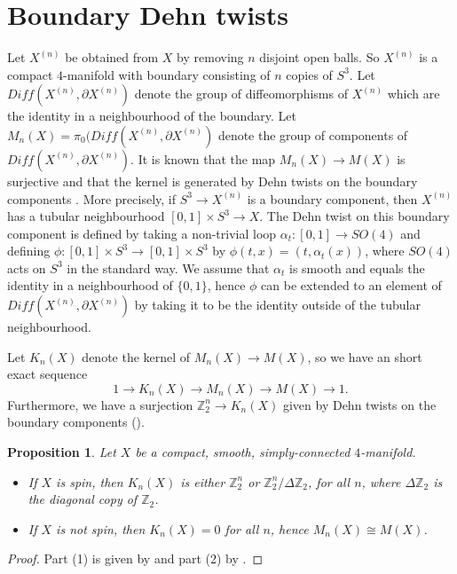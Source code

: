 \documentclass{amsart}
\newtheorem{proposition}[theorem]{Proposition}
\theoremstyle{definition}
\theoremstyle{remark}
\numberwithin{equation}{section}
\begin{document}
\section{Boundary Dehn twists}\label{sec:bdt}

Let $X^{(n)}$ be obtained from $X$ by removing $n$ disjoint open balls. So $X^{(n)}$ is a compact $4$-manifold with boundary consisting of $n$ copies of $S^3$. Let $Diff(X^{(n)} , \partial X^{(n)})$ denote the group of diffeomorphisms of $X^{(n)}$ which are the identity in a neighbourhood of the boundary. Let $M_n(X) = \pi_0( Diff( X^{(n)} , \partial X^{(n)} )$ denote the group of components of $Diff( X^{(n)} , \partial X^{(n)})$. It is known that the map $M_n(X) \to M(X)$ is surjective and that the kernel is generated by Dehn twists on the boundary components \cite{gir}. More precisely, if $S^3 \to X^{(n)}$ is a boundary component, then $X^{(n)}$ has a tubular neighbourhood $[0,1] \times S^3 \to X$. The Dehn twist on this boundary component is defined by taking a non-trivial loop $\alpha_t :  [0,1] \to SO(4)$ and defining $\phi : [0,1] \times S^3 \to [0,1] \times S^3$ by $\phi(t,x) = (t , \alpha_t(x))$, where $SO(4)$ acts on $S^3$ in the standard way. We assume that $\alpha_t$ is smooth and equals the identity in a neighbourhood of $\{ 0,1\}$, hence $\phi$ can be extended to an element of $Diff(X^{(n)} , \partial X^{(n)})$ by taking it to be the identity outside of the tubular neighbourhood.

Let $K_n(X)$ denote the kernel of $M_n(X) \to M(X)$, so we have an short exact sequence
\[
1 \to K_n(X) \to M_n(X) \to M(X) \to 1.
\]
Furthermore, we have a surjection $\mathbb{Z}_2^n \to K_n(X)$ given by Dehn twists on the boundary components (\cite[Proposition 3.1]{gir}).

\begin{proposition}\label{prop:bdt}
Let $X$ be a compact, smooth, simply-connected $4$-manifold.
\begin{itemize}
\item[(1)]{If $X$ is spin, then $K_n(X)$ is either $\mathbb{Z}_2^n$ or $\mathbb{Z}_2^n/\Delta \mathbb{Z}_2$, for all $n$, where $\Delta \mathbb{Z}_2$ is the diagonal copy of $\mathbb{Z}_2$.}
\item[(2)]{If $X$ is not spin, then $K_n(X) = 0$ for all $n$, hence $M_n(X) \cong M(X)$.}
\end{itemize}
\end{proposition}
\begin{proof}
Part (1) is given by \cite[Corollary 2.5]{gir} and part (2) by \cite[Corollary A.5]{op}.
\end{proof}
\end{document}
